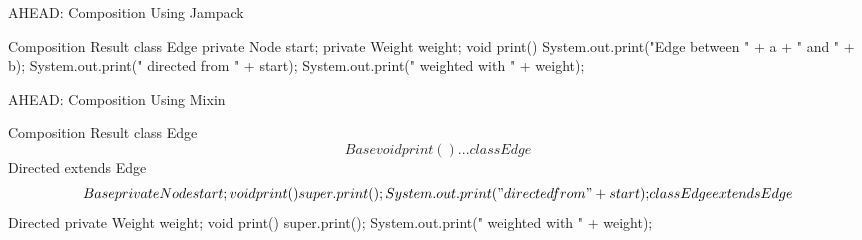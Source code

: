 \begin{frame}[fragile]{AHEAD: Composition Using Jampack}
	\begin{mycolumns}[widths={35,65},animation=none]
	\mynextcolumn
\begin{codetight}{Composition Result}
class Edge {
	private Node start;
	private Weight weight;
	void print() {
		System.out.print("Edge between " + a + " and " + b);
		System.out.print(" directed from " + start);
		System.out.print(" weighted with " + weight);
	}
}
\end{codetight}
	\end{mycolumns}
\end{frame}

\begin{frame}[fragile]{AHEAD: Composition Using Mixin}
	\begin{mycolumns}[widths={50,50},animation=none]
	\mynextcolumn
{\small
\begin{codetight}{Composition Result}
class Edge$$Base {
	void print() { ... }
}
class Edge$$Directed extends Edge$$Base {
	private Node start;
	void print() {
		super.print();
		System.out.print(" directed from " + start);
	}
}
class Edge extends Edge$$Directed {
	private Weight weight;
	void print() {
		super.print();
		System.out.print(" weighted with " + weight);
	}
}
\end{codetight}
}
	\end{mycolumns}
\end{frame}

